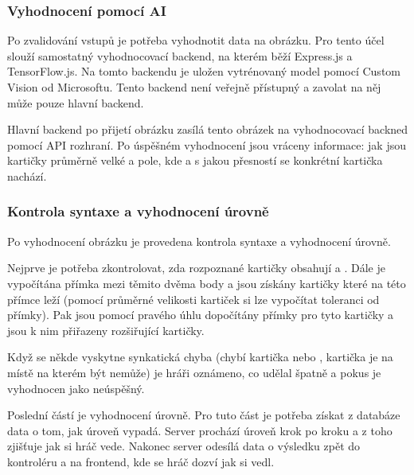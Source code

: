 \subsubsection{Vyhodnocení pomocí AI}
Po zvalidování vstupů je potřeba vyhodnotit data na obrázku. Pro tento účel slouží samostatný vyhodnocovací backend, na kterém běží Express.js a TensorFlow.js. Na tomto backendu je uložen vytrénovaný model pomocí Custom Vision od Microsoftu. Tento backend není veřejně přístupný a zavolat na něj může pouze hlavní backend.\par
Hlavní backend po přijetí obrázku zasílá tento obrázek na vyhodnocovací backned pomocí API rozhraní. Po úspěšném vyhodnocení jsou vráceny informace: jak jsou kartičky průměrně velké a pole, kde a s jakou přesností se konkrétní kartička nachází.

\subsubsection{Kontrola syntaxe a vyhodnocení úrovně}
Po vyhodnocení obrázku je provedena kontrola syntaxe a vyhodnocení úrovně.\par
Nejprve je potřeba zkontrolovat, zda rozpoznané kartičky obsahují  a . Dále je vypočítána přímka mezi těmito dvěma body a jsou získány kartičky které na této přímce leží (pomocí průměrné velikosti kartiček si lze vypočítat toleranci od přímky). Pak jsou pomocí pravého úhlu dopočítány přímky pro tyto kartičky a jsou k nim přiřazeny rozšiřující kartičky.\par
Když se někde vyskytne synkatická chyba (chybí kartička  nebo , kartička je na místě na kterém být nemůže) je hráři oznámeno, co udělal špatně a pokus je vyhodnocen jako neúspěšný.\par
Poslední částí je vyhodnocení úrovně. Pro tuto část je potřeba získat z databáze data o tom, jak úroveň vypadá. Server prochází úroveň krok po kroku a z toho zjišťuje jak si hráč vede. Nakonec server odesílá data o výsledku zpět do kontroléru a na frontend, kde se hráč dozví jak si vedl.
